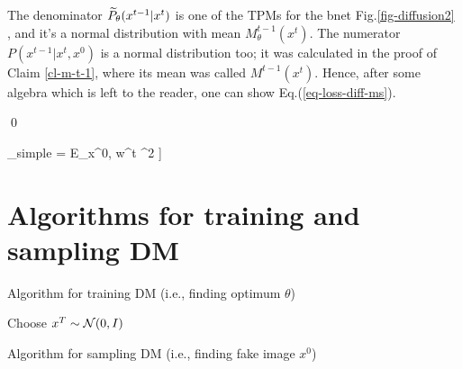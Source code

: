 The denominator
${\widetilde{P}_\theta}(x^{t-1}|x^t)$
is one of the TPMs for
the bnet Fig.\ref{fig-diffusion2} ,
and it's a normal distribution
with mean $M^{t-1}_\theta(x^t)$.
The numerator
$P(x^{t-1}|x^t,x^0)$ is
a normal distribution too;
it was calculated
in the proof
of Claim \ref{cl-m-t-1},
where its mean was called
$M^{t-1}(x^t)$.
Hence, after
some algebra
which is left to the
reader,
one can show Eq.(\ref{eq-loss-diff-ms}). 


\qed

\beq
\call_{simple} =
E_{x^0, w^t}
\left[
\left[w^t-n^{t-1}_\theta(
\sqrt{\prodalp}\; x^{0}
 +\sqrt{1-\prodalp}\;w^t
)\right]^2
\right]
\label{eq-diff-loss-simple}
\eeq

\section{Algorithms for training
and sampling DM}

\begin{algorithm}
	\DontPrintSemicolon
    
    \caption{Algorithm for training DM (i.e., finding optimum $\theta$)}
\end{algorithm}

\begin{algorithm}
	\DontPrintSemicolon
    Choose $x^T\sim{\cal N}(0, I)$\;
    \caption{Algorithm for sampling DM (i.e., finding fake image $x^0$)}
\end{algorithm}